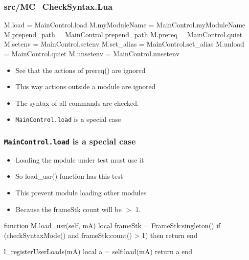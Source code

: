 \documentclass{beamer}
\begin{document}
\begin{frame}[fragile]
    \frametitle{src/MC\_CheckSyntax.Lua}
 {\tiny
    \begin{semiverbatim}
M.load                 = MainControl.load
M.myModuleName         = MainControl.myModuleName
M.prepend\_path         = MainControl.prepend\_path
M.prereq               = MainControl.quiet
M.setenv               = MainControl.setenv
M.set\_alias            = MainControl.set\_alias
M.unload               = MainControl.quiet
M.unsetenv             = MainControl.unsetenv
    \end{semiverbatim}
}
  \begin{itemize}
    \item See that the actions of prereq() are ignored
    \item This way actions outside a module are ignored
    \item The syntax of all commands are checked.
    \item \texttt{MainControl.load} is a special case
  \end{itemize}

\end{frame}

\begin{frame}[fragile]
    \frametitle{\texttt{MainControl.load} is a special case}
  \begin{itemize}
    \item Loading the module under test must use it
    \item So load\_usr()  function has this test
    \item This prevent module loading other modules
    \item Because the frameStk count will be $>$ 1.
  \end{itemize}
 {\tiny
    \begin{semiverbatim}
function M.load_usr(self, mA)
   local frameStk = FrameStk:singleton()
   if (checkSyntaxMode() and frameStk:count() > 1) then
      return {}
   end

   l_registerUserLoads(mA)
   local a = self:load(mA)
   return a
end
    \end{semiverbatim}
}

\end{frame}
\end{document}

